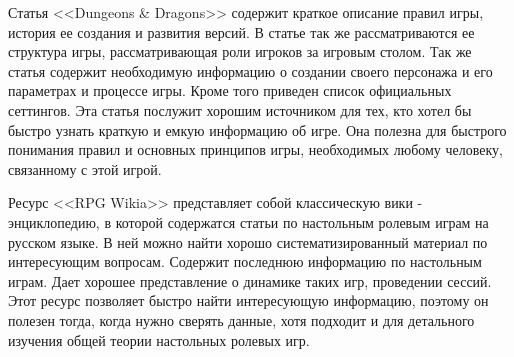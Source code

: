 Статья <<Dungeons \& Dragons>> содержит краткое описание правил игры, история ее создания и развития версий. В статье так же рассматриваются ее структура игры, рассматривающая роли игроков за игровым столом. Так же статья содержит необходимую информацию о создании своего персонажа и его параметрах и процессе игры. Кроме того приведен список официальных сеттингов. Эта статья послужит хорошим источником для тех, кто хотел бы быстро узнать краткую и емкую информацию об игре. Она полезна для быстрого понимания правил и основных принципов игры, необходимых любому человеку, связанному с этой игрой.

Ресурс <<RPG Wikia>> представляет собой классическую вики - энциклопедию, в которой содержатся статьи по настольным ролевым играм на русском языке. В ней можно найти хорошо систематизированный материал по интересующим вопросам. Содержит последнюю информацию по настольным играм. Дает хорошее представление о динамике таких игр, проведении сессий. Этот ресурс позволяет быстро найти интересующую информацию, поэтому он полезен тогда, когда нужно сверять данные, хотя подходит и для детального изучения общей теории настольных ролевых игр.

